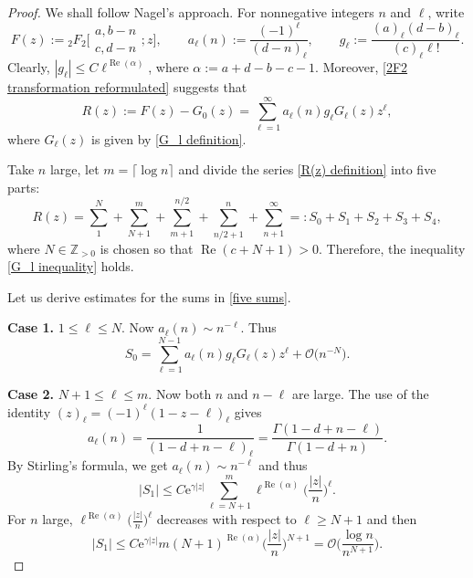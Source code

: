 \documentclass[10pt,a4paper]{amsart}
\numberwithin{equation}{section}
\newcommand{\ZZ}{\ensuremath{\mathbb{Z}}}
\newcommand{\mo}{\mathcal{O}}
\begin{document}
\begin{proof}
	We shall follow Nagel's approach. For nonnegative integers $n$ and $\ell$, write
	\[F(z):={}_2F_2\biggl[\begin{matrix}
		a,b-n\\
		c,d-n
	\end{matrix};z\biggr],\qquad a_{\ell}(n):=\frac{(-1)^{\ell}}{(d-n)_{\ell}},\qquad g_{\ell}:=\frac{(a)_{\ell}(d-b)_{\ell}}{(c)_{\ell}\ell!}.\]
	Clearly, $\left|g_\ell\right|\leqslant C\ell^{\operatorname{Re}(\alpha)}$, where $\alpha:=a+d-b-c-1$. Moreover, \eqref{2F2 transformation reformulated} suggests that
	\begin{equation}\label{R(z) definition}
		R(z):=F(z)-G_0(z)=\sum_{\ell=1}^{\infty}a_\ell(n)g_\ell G_\ell(z)z^{\ell},
	\end{equation}
	where $G_\ell(z)$ is given by \eqref{G_l definition}.
	
	Take $n$ large, let $m=\lceil \log n\rceil$ and divide the series \eqref{R(z) definition} into five parts:
	\begin{equation}\label{five sums}
		R(z)=\sum_{1}^{N}+\sum_{N+1}^m+\sum_{m+1}^{n/2}+\sum_{n/2+1}^n+\sum_{n+1}^{\infty}=:S_0+S_1+S_2+S_3+S_4,
	\end{equation}
	where $N\in\ZZ_{>0}$ is chosen so that $\operatorname{Re}(c+N+1)>0$. Therefore, the inequality \eqref{G_l inequality} holds.
	
	Let us derive estimates for the sums in \eqref{five sums}.
	
	\textbf{Case 1.} $1\leqslant \ell\leqslant N$. Now $a_\ell(n)\sim n^{-\ell}$. Thus
	\[S_0=\sum_{\ell=1}^{N-1}a_\ell(n)g_\ell G_\ell(z)z^{\ell}+\mo\big(n^{-N}\big).\]
	
	\textbf{Case 2.} $N+1\leqslant\ell\leqslant m$. Now both $n$ and $n-\ell$ are large. The use of the identity $(z)_\ell=(-1)^{\ell}(1-z-\ell)_{\ell}$ gives
	\begin{equation}\label{a_l(n) identity}
		a_\ell(n)=\frac{1}{(1-d+n-\ell)_\ell}=\frac{\Gamma(1-d+n-\ell)}{\Gamma(1-d+n)}.
	\end{equation}
	By Stirling's formula, we get $a_\ell(n)\sim n^{-\ell}$ and thus
	\[|S_1|\leqslant C\mathrm{e}^{\gamma|z|}\sum_{\ell=N+1}^{m}\ell^{\operatorname{Re}(\alpha)}\biggl(\frac{|z|}{n}\biggr)^{\ell}.\]
	For $n$ large, $\ell^{\operatorname{Re}(\alpha)}\big(\frac{|z|}{n}\big)^{\ell}$ decreases with respect to $\ell\geqslant N+1$ and then
	\[|S_1|\leqslant C\mathrm{e}^{\gamma|z|}m(N+1)^{\operatorname{Re}(\alpha)}\biggl(\frac{|z|}{n}\biggr)^{N+1}=\mo\biggl(\frac{\log n}{n^{N+1}}\biggr).\]
	

\end{proof}
\end{document}
